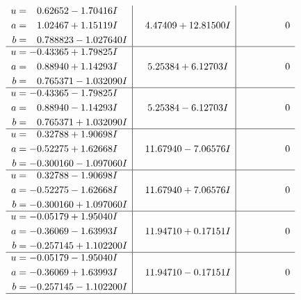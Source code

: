 \documentclass[1p]{elsarticle_modified}
\theoremstyle{definition}
\begin{document}
$$\begin{array}{c|c|c}
\begin{aligned}
u &= \phantom{-}0.62652 - 1.70416 I \\
a &= \phantom{-}1.02467 + 1.15119 I \\
b &= \phantom{-}0.788823 - 1.027640 I\end{aligned}
 & \phantom{-}4.47409 + 12.81500 I & \phantom{-0.000000 } 0 \\ \hline\begin{aligned}
u &= -0.43365 + 1.79825 I \\
a &= \phantom{-}0.88940 + 1.14293 I \\
b &= \phantom{-}0.765371 - 1.032090 I\end{aligned}
 & \phantom{-}5.25384 + 6.12703 I & \phantom{-0.000000 } 0 \\ \hline\begin{aligned}
u &= -0.43365 - 1.79825 I \\
a &= \phantom{-}0.88940 - 1.14293 I \\
b &= \phantom{-}0.765371 + 1.032090 I\end{aligned}
 & \phantom{-}5.25384 - 6.12703 I & \phantom{-0.000000 } 0 \\ \hline\begin{aligned}
u &= \phantom{-}0.32788 + 1.90698 I \\
a &= -0.52275 + 1.62668 I \\
b &= -0.300160 - 1.097060 I\end{aligned}
 & \phantom{-}11.67940 - 7.06576 I & \phantom{-0.000000 } 0 \\ \hline\begin{aligned}
u &= \phantom{-}0.32788 - 1.90698 I \\
a &= -0.52275 - 1.62668 I \\
b &= -0.300160 + 1.097060 I\end{aligned}
 & \phantom{-}11.67940 + 7.06576 I & \phantom{-0.000000 } 0 \\ \hline\begin{aligned}
u &= -0.05179 + 1.95040 I \\
a &= -0.36069 - 1.63993 I \\
b &= -0.257145 + 1.102200 I\end{aligned}
 & \phantom{-}11.94710 + 0.17151 I & \phantom{-0.000000 } 0 \\ \hline\begin{aligned}
u &= -0.05179 - 1.95040 I \\
a &= -0.36069 + 1.63993 I \\
b &= -0.257145 - 1.102200 I\end{aligned}
 & \phantom{-}11.94710 - 0.17151 I & \phantom{-0.000000 } 0\\
 \hline 
 \end{array}$$\newpage\newpage\renewcommand{\arraystretch}{1}
\end{document}
